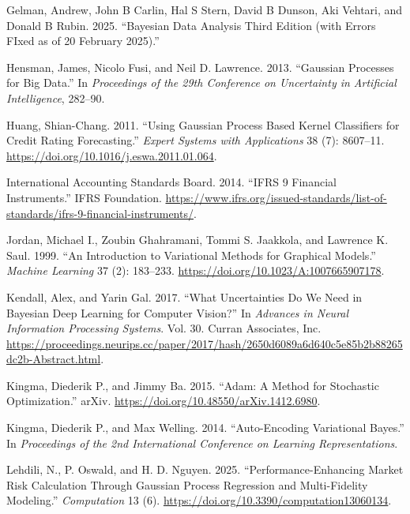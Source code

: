 \documentclass[
  letterpaper,
  DIV=11,
  numbers=noendperiod]{scrartcl}
\newlength{\cslhangindent}
\newenvironment{CSLReferences}[2] %
 {\begin{list}{}{%
  \setlength{\itemindent}{0pt}
  \setlength{\leftmargin}{0pt}
  \setlength{\parsep}{0pt}
  \ifodd #1
   \setlength{\leftmargin}{\cslhangindent}
   \setlength{\itemindent}{-1\cslhangindent}
  \fi
  \setlength{\itemsep}{#2\baselineskip}}}
 {\end{list}}
\begin{document}
\begin{CSLReferences}{1}{0}
Gelman, Andrew, John B Carlin, Hal S Stern, David B Dunson, Aki Vehtari,
and Donald B Rubin. 2025. {``Bayesian {Data} {Analysis} {Third} Edition
(with Errors FIxed as of 20 {February} 2025).''}

Hensman, James, Nicolo Fusi, and Neil D. Lawrence. 2013. {``Gaussian
Processes for Big Data.''} In \emph{Proceedings of the 29th Conference
on Uncertainty in Artificial Intelligence}, 282--90.

Huang, Shian-Chang. 2011. {``Using {Gaussian} Process Based Kernel
Classifiers for Credit Rating Forecasting.''} \emph{Expert Systems with
Applications} 38 (7): 8607--11.
\url{https://doi.org/10.1016/j.eswa.2011.01.064}.

International Accounting Standards Board. 2014. {``{IFRS} 9 Financial
Instruments.''} IFRS Foundation.
\url{https://www.ifrs.org/issued-standards/list-of-standards/ifrs-9-financial-instruments/}.

Jordan, Michael I., Zoubin Ghahramani, Tommi S. Jaakkola, and Lawrence
K. Saul. 1999. {``An Introduction to Variational Methods for Graphical
Models.''} \emph{Machine Learning} 37 (2): 183--233.
\url{https://doi.org/10.1023/A:1007665907178}.

Kendall, Alex, and Yarin Gal. 2017. {``What {Uncertainties} {Do} {We}
{Need} in {Bayesian} {Deep} {Learning} for {Computer} {Vision}?''} In
\emph{Advances in {Neural} {Information} {Processing} {Systems}}. Vol.
30. Curran Associates, Inc.
\url{https://proceedings.neurips.cc/paper/2017/hash/2650d6089a6d640c5e85b2b88265dc2b-Abstract.html}.

Kingma, Diederik P., and Jimmy Ba. 2015. {``Adam: {A} {Method} for
{Stochastic} {Optimization}.''} arXiv.
\url{https://doi.org/10.48550/arXiv.1412.6980}.

Kingma, Diederik P., and Max Welling. 2014. {``Auto-{Encoding}
Variational {Bayes}.''} In \emph{Proceedings of the 2nd International
Conference on Learning Representations}.

Lehdili, N., P. Oswald, and H. D. Nguyen. 2025.
{``Performance-{Enhancing} {Market} {Risk} {Calculation} {Through}
{Gaussian} {Process} {Regression} and {Multi}-{Fidelity} {Modeling}.''}
\emph{Computation} 13 (6).
\url{https://doi.org/10.3390/computation13060134}.


\end{CSLReferences}
\end{document}
